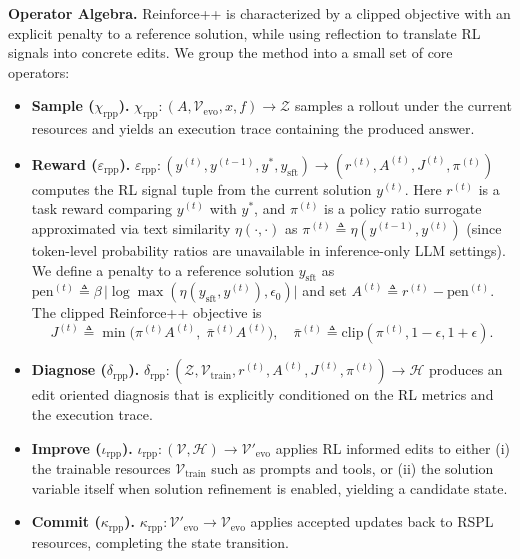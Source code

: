 \textbf{Operator Algebra.}
Reinforce++ is characterized by a clipped objective with an explicit penalty to a reference solution, while using reflection to translate RL signals into concrete edits. We group the method into a small set of core operators:
\begin{itemize}[leftmargin=1em, itemsep=0em, parsep=0em, topsep=0em, partopsep=0em]
  \item \textbf{Sample ($\chi_{\mathrm{rpp}}$).} $\chi_{\mathrm{rpp}}: (A, \mathcal{V}_{\text{evo}}, x, f) \rightarrow \mathcal{Z}$ samples a rollout under the current resources and yields an execution trace containing the produced answer.
  \item \textbf{Reward ($\varepsilon_{\mathrm{rpp}}$).} $\varepsilon_{\mathrm{rpp}}: (y^{(t)}, y^{(t-1)}, y^{*}, y_{\mathrm{sft}}) \rightarrow (r^{(t)}, A^{(t)}, J^{(t)}, \pi^{(t)})$ computes the RL signal tuple from the current solution $y^{(t)}$. Here $r^{(t)}$ is a task reward comparing $y^{(t)}$ with $y^{*}$, and $\pi^{(t)}$ is a policy ratio surrogate approximated via text similarity $\eta(\cdot,\cdot)$ as $\pi^{(t)} \triangleq \eta(y^{(t-1)}, y^{(t)})$ (since token-level probability ratios are unavailable in inference-only LLM settings). We define a penalty to a reference solution $y_{\mathrm{sft}}$ as $\mathrm{pen}^{(t)} \triangleq \beta\,\bigl|\log \max(\eta(y_{\mathrm{sft}}, y^{(t)}), \epsilon_0)\bigr|$ and set $A^{(t)} \triangleq r^{(t)} - \mathrm{pen}^{(t)}$. The clipped Reinforce++ objective is
  \[
    J^{(t)} \triangleq \min\bigl(\pi^{(t)} A^{(t)},\; \bar{\pi}^{(t)} A^{(t)}\bigr),
    \quad \bar{\pi}^{(t)} \triangleq \mathrm{clip}(\pi^{(t)}, 1-\epsilon, 1+\epsilon).
  \]
  \item \textbf{Diagnose ($\delta_{\mathrm{rpp}}$).} $\delta_{\mathrm{rpp}}: (\mathcal{Z}, \mathcal{V}_{\text{train}}, r^{(t)}, A^{(t)}, J^{(t)}, \pi^{(t)}) \rightarrow \mathcal{H}$ produces an edit oriented diagnosis that is explicitly conditioned on the RL metrics and the execution trace.
  \item \textbf{Improve ($\iota_{\mathrm{rpp}}$).} $\iota_{\mathrm{rpp}}: (\mathcal{V}, \mathcal{H}) \rightarrow \mathcal{V}'_{\text{evo}}$ applies RL informed edits to either (i) the trainable resources $\mathcal{V}_{\text{train}}$ such as prompts and tools, or (ii) the solution variable itself when solution refinement is enabled, yielding a candidate state.
  \item \textbf{Commit ($\kappa_{\mathrm{rpp}}$).} $\kappa_{\mathrm{rpp}}: \mathcal{V}'_{\text{evo}} \rightarrow \mathcal{V}_{\text{evo}}$ applies accepted updates back to RSPL resources, completing the state transition.
\end{itemize}

